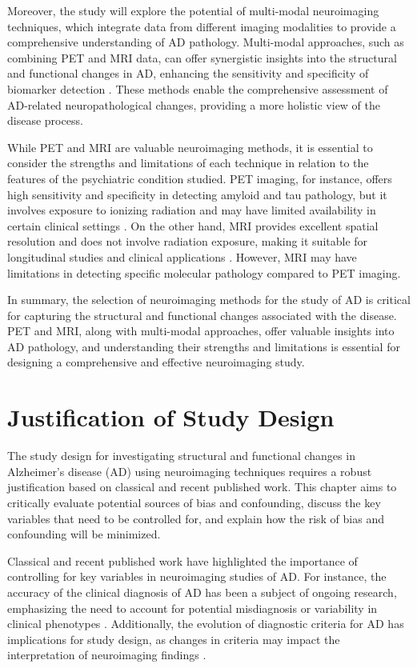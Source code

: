 \documentclass[10pt]{article}
\begin{document}
\begin{sloppypar}
  Moreover, the study will explore the potential of multi-modal neuroimaging techniques, which integrate data from different imaging modalities to provide a comprehensive understanding of AD pathology. Multi-modal approaches, such as combining PET and MRI data, can offer synergistic insights into the structural and functional changes in AD, enhancing the sensitivity and specificity of biomarker detection \citep{ran_multimodal_2022}. These methods enable the comprehensive assessment of AD-related neuropathological changes, providing a more holistic view of the disease process.

  While PET and MRI are valuable neuroimaging methods, it is essential to consider the strengths and limitations of each technique in relation to the features of the psychiatric condition studied. PET imaging, for instance, offers high sensitivity and specificity in detecting amyloid and tau pathology, but it involves exposure to ionizing radiation and may have limited availability in certain clinical settings \citep{bao_pet_2021}. On the other hand, MRI provides excellent spatial resolution and does not involve radiation exposure, making it suitable for longitudinal studies and clinical applications \citep{cai_magnetic_2020}. However, MRI may have limitations in detecting specific molecular pathology compared to PET imaging.

  In summary, the selection of neuroimaging methods for the study of AD is critical for capturing the structural and functional changes associated with the disease. PET and MRI, along with multi-modal approaches, offer valuable insights into AD pathology, and understanding their strengths and limitations is essential for designing a comprehensive and effective neuroimaging study.

  \section{Justification of Study Design}
  \label{sec:justification-of-study-design}

  The study design for investigating structural and functional changes in Alzheimer's disease (AD) using neuroimaging techniques requires a robust justification based on classical and recent published work. This chapter aims to critically evaluate potential sources of bias and confounding, discuss the key variables that need to be controlled for, and explain how the risk of bias and confounding will be minimized.

  Classical and recent published work have highlighted the importance of controlling for key variables in neuroimaging studies of AD. For instance, the accuracy of the clinical diagnosis of AD has been a subject of ongoing research, emphasizing the need to account for potential misdiagnosis or variability in clinical phenotypes . Additionally, the evolution of diagnostic criteria for AD has implications for study design, as changes in criteria may impact the interpretation of neuroimaging findings .


\end{sloppypar}
\end{document}

